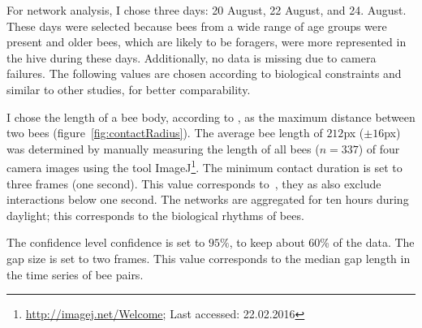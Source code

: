 For network analysis, I chose three days: 20 August, 22 August, and 24. August.
These days were selected because bees from a wide range of age groups were present and older bees, which are likely to be foragers, were more represented in the hive during these days.
Additionally, no data is missing due to camera failures.
The following values are chosen according to biological constraints and similar to other studies, for better comparability.

I chose the length of a bee body, according to \textcite{baracchi2014socio}, as the maximum distance between two bees (figure~\ref{fig:contactRadius}). The average bee length of $212$px ($\pm 16$px)  was determined by manually measuring the length of all bees ($n=337$) of four camera images using the tool ImageJ\footnote{\url{http://imagej.net/Welcome}; Last accessed:
 22.02.2016}.
The minimum contact duration is set to three frames (one second). This value corresponds to~\textcite{mersch2013tracking}, they as also exclude interactions below one second.
The networks are aggregated for ten hours during daylight; this corresponds to the biological rhythms of bees.

The confidence level confidence is set to $95\%$, to keep about 60\% of the data.
The gap size is set to two frames. This value corresponds to the median gap length in the time series of bee pairs.

